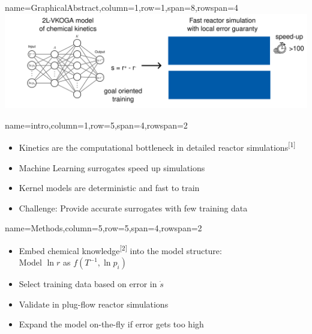 \documentclass[
	accentcolor=3c,
	boxstyle=colored, %
	colorback=false,
	title=small
	]{tudasciposter}
\begin{document}
\begin{tcbposter}[
	poster={
		columns=8,
		rows=12,
		spacing=1cm,
	},]

\begin{posterboxenv}{name=GraphicalAbstract,column=1,row=1,span=8,rowspan=4}
	\centering
	\includegraphics[width=\textwidth]{abb/GA_draft}
\end{posterboxenv}

\begin{posterboxenv}[title=1. Introduction]{name=intro,column=1,row=5,span=4,rowspan=2}
	\begin{itemize}
		\item Kinetics are the computational bottleneck in detailed reactor simulations\textsuperscript{[1]}
		\item Machine Learning surrogates speed up simulations
		\item Kernel models are deterministic and fast to train 
		\item Challenge: Provide accurate surrogates with few training data
	\end{itemize}
\end{posterboxenv}

\begin{posterboxenv}[title=2. Methods]{name=Methods,column=5,row=5,span=4,rowspan=2}
	\begin{itemize}
		\item Embed chemical knowledge\textsuperscript{[2]} into the model structure:\\
		Model $\ln r$ as $f(T^{-1}, \ln p_i)$
		\item Select training data based on error in $\dot{s}$
		\item Validate in plug-flow reactor simulations
		\item Expand the model on-the-fly if error gets too high
	\end{itemize}


\end{posterboxenv}
\end{tcbposter}
\end{document}

